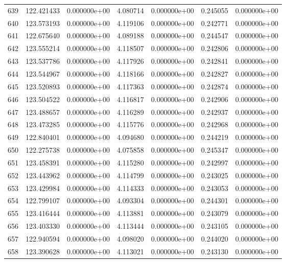 \begin{tabular}{rrrrrrr}
 639 & 122.421433 &  0.000000e+00 &  4.080714 &  0.000000e+00 &    0.245055 &  0.000000e+00 \\
 640 & 123.573193 &  0.000000e+00 &  4.119106 &  0.000000e+00 &    0.242771 &  0.000000e+00 \\
 641 & 122.675640 &  0.000000e+00 &  4.089188 &  0.000000e+00 &    0.244547 &  0.000000e+00 \\
 642 & 123.555214 &  0.000000e+00 &  4.118507 &  0.000000e+00 &    0.242806 &  0.000000e+00 \\
 643 & 123.537786 &  0.000000e+00 &  4.117926 &  0.000000e+00 &    0.242841 &  0.000000e+00 \\
 644 & 123.544967 &  0.000000e+00 &  4.118166 &  0.000000e+00 &    0.242827 &  0.000000e+00 \\
 645 & 123.520893 &  0.000000e+00 &  4.117363 &  0.000000e+00 &    0.242874 &  0.000000e+00 \\
 646 & 123.504522 &  0.000000e+00 &  4.116817 &  0.000000e+00 &    0.242906 &  0.000000e+00 \\
 647 & 123.488657 &  0.000000e+00 &  4.116289 &  0.000000e+00 &    0.242937 &  0.000000e+00 \\
 648 & 123.473285 &  0.000000e+00 &  4.115776 &  0.000000e+00 &    0.242968 &  0.000000e+00 \\
 649 & 122.840401 &  0.000000e+00 &  4.094680 &  0.000000e+00 &    0.244219 &  0.000000e+00 \\
 650 & 122.275738 &  0.000000e+00 &  4.075858 &  0.000000e+00 &    0.245347 &  0.000000e+00 \\
 651 & 123.458391 &  0.000000e+00 &  4.115280 &  0.000000e+00 &    0.242997 &  0.000000e+00 \\
 652 & 123.443962 &  0.000000e+00 &  4.114799 &  0.000000e+00 &    0.243025 &  0.000000e+00 \\
 653 & 123.429984 &  0.000000e+00 &  4.114333 &  0.000000e+00 &    0.243053 &  0.000000e+00 \\
 654 & 122.799107 &  0.000000e+00 &  4.093304 &  0.000000e+00 &    0.244301 &  0.000000e+00 \\
 655 & 123.416444 &  0.000000e+00 &  4.113881 &  0.000000e+00 &    0.243079 &  0.000000e+00 \\
 656 & 123.403330 &  0.000000e+00 &  4.113444 &  0.000000e+00 &    0.243105 &  0.000000e+00 \\
 657 & 122.940594 &  0.000000e+00 &  4.098020 &  0.000000e+00 &    0.244020 &  0.000000e+00 \\
 658 & 123.390628 &  0.000000e+00 &  4.113021 &  0.000000e+00 &    0.243130 &  0.000000e+00 \\

\end{tabular}
